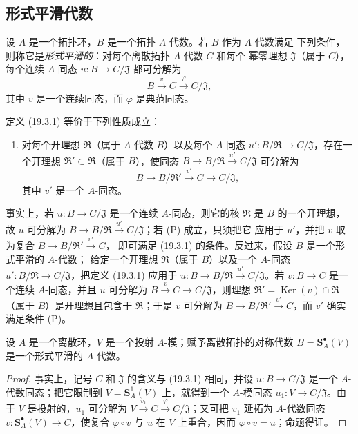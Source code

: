 \subsection{形式平滑代数}
\label{subsection:0.19.3-fr}

\begin{definition}[19.3.1]
\label{0.19.3.1-fr}
设 $A$ 是一个拓扑环，$B$ 是一个拓扑 $A$-代数。若 $B$ 作为 $A$-代数满足
下列条件，则称它是\emph{形式平滑的}：对每个离散拓扑 $A$-代数 $C$ 和每个
幂零理想 $\mathfrak J$（属于 $C$），每个连续 $A$-同态
$u:B\to C/\mathfrak J$ 都可分解为
\[
  B\xrightarrow{v}C\xrightarrow{\varphi}C/\mathfrak J,
\]
其中 $v$ 是一个连续同态，而 $\varphi$ 是典范同态。
\end{definition}


定义 (19.3.1) 等价于下列性质成立：
\begin{enumerate}
  \item[(P)] 对每个开理想 $\mathfrak R$（属于 $A$-代数 $B$）以及每个
  $A$-同态 $u':B/\mathfrak R\to C/\mathfrak J$，存在一个开理想
  $\mathfrak R'\subset\mathfrak R$（属于 $B$），使同态
  $B\to B/\mathfrak R\xrightarrow{u'}C/\mathfrak J$ 可分解为
  \[
    B\to B/\mathfrak R'\xrightarrow{v'}C\to C/\mathfrak J,
  \]
  其中 $v'$ 是一个 $A$-同态。
\end{enumerate}
事实上，若 $u:B\to C/\mathfrak J$ 是一个连续 $A$-同态，则它的核
$\mathfrak R$ 是 $B$ 的一个开理想，故 $u$ 可分解为
$B\to B/\mathfrak R\xrightarrow{u'}C/\mathfrak J$；若 (P) 成立，只须把它
应用于 $u'$，并把 $v$ 取为复合 $B\to B/\mathfrak R'\xrightarrow{v'}C$，
即可满足 (19.3.1) 的条件。反过来，假设 $B$ 是一个形式平滑的 $A$-代数；
给定一个开理想 $\mathfrak R$（属于 $B$）以及一个
$A$-同态 $u':B/\mathfrak R\to C/\mathfrak J$，把定义 (19.3.1) 应用于
$u:B\to B/\mathfrak R\xrightarrow{u'}C/\mathfrak J$。若
$v:B\to C$ 是一个连续 $A$-同态，并且 $u$ 可分解为
$B\xrightarrow{v}C\to C/\mathfrak J$，则理想
$\mathfrak R'=\operatorname{Ker}(v)\cap\mathfrak R$（属于 $B$）是开理想且包含于
$\mathfrak R$；于是 $v$ 可分解为
$B\to B/\mathfrak R'\xrightarrow{v'}C$，而 $v'$ 确实满足条件 (P)。

\begin{proposition}[19.3.2]
\label{0.19.3.2-fr}
设 $A$ 是一个离散环，$V$ 是一个投射 $A$-模；赋予离散拓扑的对称代数
$B=\mathbf S_A^\bullet(V)$ 是一个形式平滑的 $A$-代数。
\end{proposition}

\begin{proof}
事实上，记号 $C$ 和 $\mathfrak J$ 的含义与 (19.3.1) 相同，并设
$u:B\to C/\mathfrak J$ 是一个 $A$-代数同态；把它限制到
$V=\mathbf S_A^1(V)$ 上，就得到一个 $A$-模同态
$u_1:V\to C/\mathfrak J$。由于 $V$ 是投射的，$u_1$ 可分解为
$V\xrightarrow{v_1}C\xrightarrow{\varphi}C/\mathfrak J$；又可把 $v_1$
延拓为 $A$-代数同态 $v:\mathbf S_A^\bullet(V)\to C$，使复合
$\varphi\circ v$ 与 $u$ 在 $V$ 上重合，因而 $\varphi\circ v=u$；命题得证。
\end{proof}

